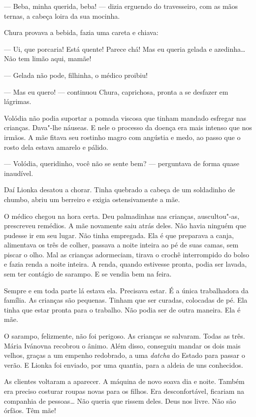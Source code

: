 --- Beba, minha querida, beba! --- dizia erguendo do travesseiro, com as
mãos ternas, a cabeça loira da sua mocinha.

Chura provava a bebida, fazia uma careta e chiava:

--- Ui, que porcaria! Está quente! Parece chá! Mas eu queria gelada e
azedinha\ldots{} Não tem limão aqui, mamãe!

--- Gelada não pode, filhinha, o médico proibiu!

--- Mas eu quero! --- continuou Chura, caprichosa, pronta a se desfazer
em lágrimas.

Volódia não podia suportar a pomada viscosa que tinham mandado esfregar
nas crianças. Dava"-lhe náuseas. E nele o processo da doença era mais
intenso que nos irmãos. A mãe fitava seu rostinho magro com angústia e medo, ao
passo que o rosto dela estava amarelo e pálido.

--- Volódia, queridinho, você não se sente bem? --- perguntava de forma
quase inaudível.

Daí Lionka desatou a chorar. Tinha quebrado a cabeça de um soldadinho de
chumbo, abriu um berreiro e exigia ostensivamente a mãe.

O médico chegou na hora certa. Deu palmadinhas nas crianças,
auscultou"-as, prescreveu remédios. A mãe novamente saiu atrás deles. Não
havia ninguém que pudesse ir em seu lugar. Não tinha empregada. Ela é
que preparava a canja, alimentava os três de colher, passava a noite
inteira ao pé de suas camas, sem piscar o olho. Mal as crianças
adormeciam, tirava o crochê interrompido do bolso e fazia renda a noite
inteira. A renda, quando estivesse pronta, podia ser lavada, sem ter
contágio de sarampo. E se vendia bem na feira.

Sempre e em toda parte lá estava ela. Precisava estar. É a única
trabalhadora da família. As crianças são pequenas. Tinham que ser
curadas, colocadas de pé. Ela tinha que estar pronta para o trabalho.
Não podia ser de outra maneira. Ela é mãe.

\asterisc

O sarampo, felizmente, não foi perigoso. As crianças se salvaram. Todas
as três. Mária Ivánovna recobrou o ânimo. Além disso, conseguiu mandar
os dois mais velhos, graças a um empenho redobrado, a uma
\emph{datcha} do Estado para passar o verão. E Lionka foi enviado, por
uma quantia, para a aldeia de uns conhecidos.

As clientes voltaram a aparecer. A máquina de novo soava dia e noite.
Também era preciso costurar roupas novas para os filhos. Era
desconfortável, ficariam na companhia de pessoas\ldots{} Não queria que
rissem deles. Deus nos livre. Não são órfãos. Têm mãe!

